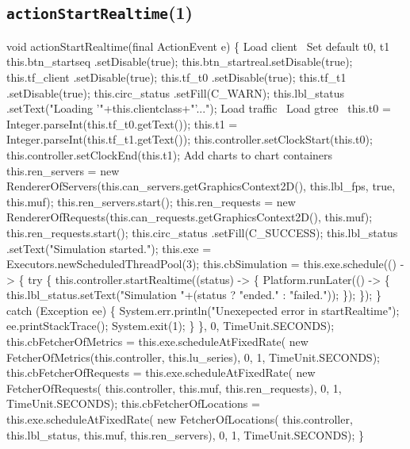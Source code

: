 \subsection{\texttt{actionStartRealtime}(1)}
\nwenddocs{}\endmoddef{}
void actionStartRealtime(final ActionEvent e) \{
  \LA{}Load client~{\nwtagstyle{}}\RA{}
  \LA{}Set default t0, t1~{\nwtagstyle{}}\RA{}
  this.btn_startseq .setDisable(true);
  this.btn_startreal.setDisable(true);
  this.tf_client     .setDisable(true);
  this.tf_t0        .setDisable(true);
  this.tf_t1        .setDisable(true);
  this.circ_status  .setFill(C_WARN);
  this.lbl_status   .setText("Loading '"+this.clientclass+"'...");
  \LA{}Load traffic~{\nwtagstyle{}}\RA{}
  \LA{}Load gtree~{\nwtagstyle{}}\RA{}
  this.t0 = Integer.parseInt(this.tf_t0.getText());
  this.t1 = Integer.parseInt(this.tf_t1.getText());
  this.controller.setClockStart(this.t0);
  this.controller.setClockEnd(this.t1);
  \LA{}Add charts to chart containers~{\nwtagstyle{}}\RA{}
  this.ren_servers = new RendererOfServers(this.can_servers.getGraphicsContext2D(), this.lbl_fps, true, this.muf);
  this.ren_servers.start();
  this.ren_requests = new RendererOfRequests(this.can_requests.getGraphicsContext2D(), this.muf);
  this.ren_requests.start();
  this.circ_status  .setFill(C_SUCCESS);
  this.lbl_status   .setText("Simulation started.");
  this.exe = Executors.newScheduledThreadPool(3);
  this.cbSimulation = this.exe.schedule(() -> \{
    try \{
      this.controller.startRealtime((status) -> \{
        Platform.runLater(() -> \{
          this.lbl_status.setText("Simulation "+(status ? "ended." : "failed."));
        \});
      \});
    \} catch (Exception ee) \{
      System.err.println("Unexepected error in startRealtime");
      ee.printStackTrace();
      System.exit(1);
    \}
  \}, 0, TimeUnit.SECONDS);
  this.cbFetcherOfMetrics = this.exe.scheduleAtFixedRate(
      new FetcherOfMetrics(this.controller, this.lu_series), 0, 1, TimeUnit.SECONDS);
  this.cbFetcherOfRequests = this.exe.scheduleAtFixedRate(
      new FetcherOfRequests(
        this.controller, this.muf, this.ren_requests), 0, 1, TimeUnit.SECONDS);
  this.cbFetcherOfLocations = this.exe.scheduleAtFixedRate(
      new FetcherOfLocations(
        this.controller, this.lbl_status, this.muf, this.ren_servers), 0, 1, TimeUnit.SECONDS);
\}
\eatline
{}\nwendcode{}\nwdocspar
